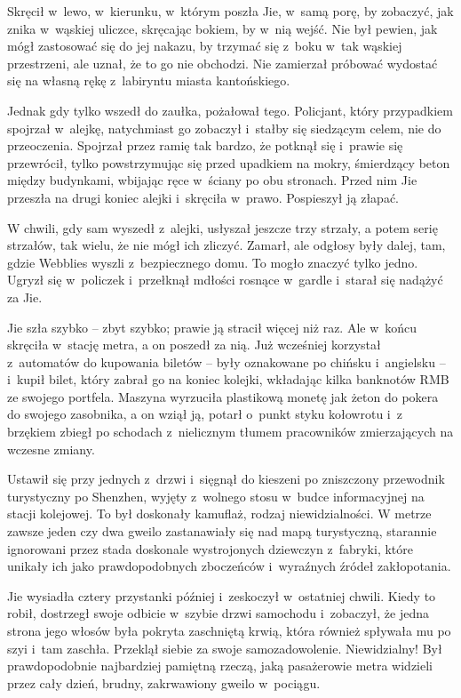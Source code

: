 \documentclass[oneside,polish,11pt,rmheadings]{mwbk}
\begin{document}
Skręcił w~lewo, w~kierunku, w~którym poszła Jie, w~samą porę, by zobaczyć, jak znika w~wąskiej uliczce, skręcając bokiem, by w~nią wejść. Nie był pewien, jak mógł zastosować się do jej nakazu, by trzymać się z~boku w~tak wąskiej przestrzeni, ale uznał, że to go nie obchodzi. Nie zamierzał próbować wydostać się na własną rękę z~labiryntu miasta kantońskiego.

Jednak gdy tylko wszedł do zaułka, pożałował tego. Policjant, który przypadkiem spojrzał w~alejkę, natychmiast go zobaczył i~stałby się siedzącym celem, nie do przeoczenia. Spojrzał przez ramię tak bardzo, że potknął się i~prawie się przewrócił, tylko powstrzymując się przed upadkiem na mokry, śmierdzący beton między budynkami, wbijając ręce w~ściany po obu stronach. Przed nim Jie przeszła na drugi koniec alejki i~skręciła w~prawo. Pospieszył ją złapać.

W chwili, gdy sam wyszedł z~alejki, usłyszał jeszcze trzy strzały, a potem serię strzałów, tak wielu, że nie mógł ich zliczyć. Zamarł, ale odgłosy były dalej, tam, gdzie Webblies wyszli z~bezpiecznego domu. To mogło znaczyć tylko jedno. Ugryzł się w~policzek i~przełknął mdłości rosnące w~gardle i~starał się nadążyć za Jie.

Jie szła szybko -- zbyt szybko; prawie ją stracił więcej niż raz. Ale w~końcu skręciła w~stację metra, a on poszedł za nią. Już wcześniej korzystał z~automatów do kupowania biletów -- były oznakowane po chińsku i~angielsku -- i~kupił bilet, który zabrał go na koniec kolejki, wkładając kilka banknotów RMB ze swojego portfela. Maszyna wyrzuciła plastikową monetę jak żeton do pokera do swojego zasobnika, a on wziął ją, potarł o~punkt styku kołowrotu i~z brzękiem zbiegł po schodach z~nielicznym tłumem pracowników zmierzających na wczesne zmiany.

Ustawił się przy jednych z~drzwi i~sięgnął do kieszeni po zniszczony przewodnik turystyczny po Shenzhen, wyjęty z~wolnego stosu w~budce informacyjnej na stacji kolejowej. To był doskonały kamuflaż, rodzaj niewidzialności. W metrze zawsze jeden czy dwa gweilo zastanawiały się nad mapą turystyczną, starannie ignorowani przez stada doskonale wystrojonych dziewczyn z~fabryki, które unikały ich jako prawdopodobnych zboczeńców i~wyraźnych źródeł zakłopotania.

Jie wysiadła cztery przystanki później i~zeskoczył w~ostatniej chwili. Kiedy to robił, dostrzegł swoje odbicie w~szybie drzwi samochodu i~zobaczył, że jedna strona jego włosów była pokryta zaschniętą krwią, która również spływała mu po szyi i~tam zaschła. Przeklął siebie za swoje samozadowolenie. Niewidzialny! Był prawdopodobnie najbardziej pamiętną rzeczą, jaką pasażerowie metra widzieli przez cały dzień, brudny, zakrwawiony gweilo w~pociągu.
\end{document}
